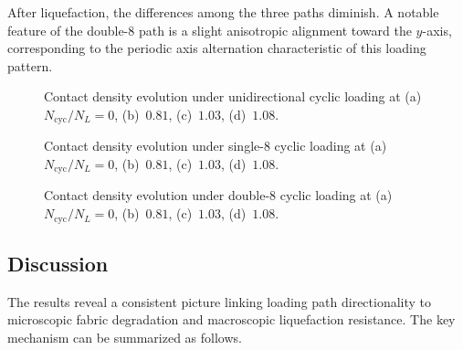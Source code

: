 After liquefaction, the differences among the three paths diminish. A notable feature of the double-8 path is a slight anisotropic alignment toward the $y$-axis, corresponding to the periodic axis alternation characteristic of this loading pattern.

\begin{figure}
  \centering
  \hfill
  \hfill
  \hfill
  \caption{Contact density evolution under unidirectional cyclic loading at
    (a)~$N_{\mathrm{cyc}}/N_L = 0$,
    (b)~$0.81$,
    (c)~$1.03$,
    (d)~$1.08$.}
  \label{fig:contact_density_uni}
\end{figure}

\begin{figure}
  \centering
  \hfill
  \hfill
  \hfill
  \caption{Contact density evolution under single-8 cyclic loading at
    (a)~$N_{\mathrm{cyc}}/N_L = 0$,
    (b)~$0.81$,
    (c)~$1.03$,
    (d)~$1.08$.}
  \label{fig:contact_density_s8}
\end{figure}

\begin{figure}
  \centering
  \hfill
  \hfill
  \hfill
  \caption{Contact density evolution under double-8 cyclic loading at
    (a)~$N_{\mathrm{cyc}}/N_L = 0$,
    (b)~$0.81$,
    (c)~$1.03$,
    (d)~$1.08$.}
  \label{fig:contact_density_d8}
\end{figure}


\subsection{Discussion}
\label{subsec:discussion}

The results reveal a consistent picture linking loading path directionality to microscopic fabric degradation and macroscopic liquefaction resistance. The key mechanism can be summarized as follows.

